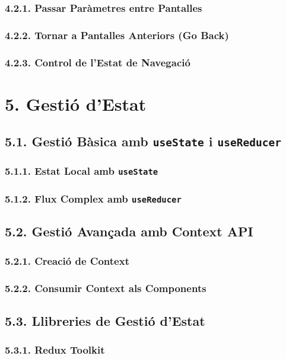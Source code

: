 \documentclass[12pt]{beamer}
\begin{document}
	\subsubsection{4.2.1. Passar Paràmetres entre Pantalles}
	\subsubsection{4.2.2. Tornar a Pantalles Anteriors (Go Back)}
	\subsubsection{4.2.3. Control de l'Estat de Navegació}
	
	\section{5. Gestió d'Estat}
	
	\subsection{5.1. Gestió Bàsica amb \texttt{useState} i \texttt{useReducer}}
	\subsubsection{5.1.1. Estat Local amb \texttt{useState}}
	\subsubsection{5.1.2. Flux Complex amb \texttt{useReducer}}
	
	\subsection{5.2. Gestió Avançada amb Context API}
	\subsubsection{5.2.1. Creació de Context}
	\subsubsection{5.2.2. Consumir Context als Components}
	
	\subsection{5.3. Llibreries de Gestió d'Estat}
	\subsubsection{5.3.1. Redux Toolkit}
\end{document}
